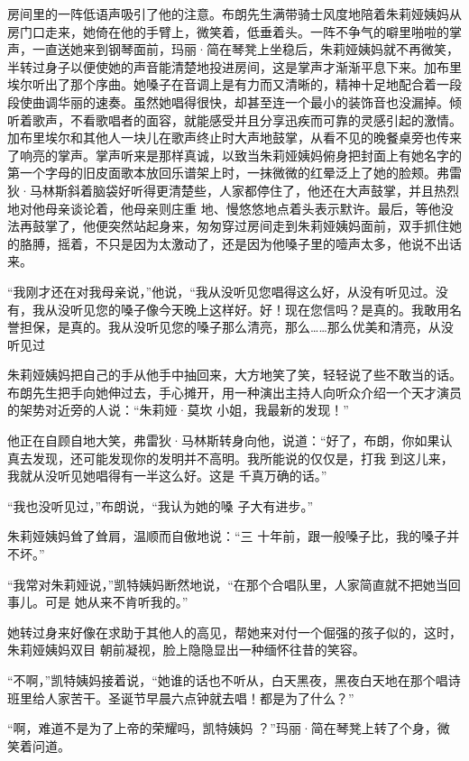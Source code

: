 \documentclass{article}
\begin{document}
房间里的一阵低语声吸引了他的注意。布朗先生满带骑士风度地陪着朱莉娅姨妈从房门口走来，她倚在他的手臂上，微笑着，低垂着头。一阵不争气的噼里啪啦的掌声，一直送她来到钢琴面前，玛丽·简在琴凳上坐稳后，朱莉娅姨妈就不再微笑，半转过身子以便使她的声音能清楚地投进房间，这是掌声才渐渐平息下来。加布里埃尔听出了那个序曲。她嗓子在音调上是有力而又清晰的，精神十足地配合着一段段使曲调华丽的速奏。虽然她唱得很快，却甚至连一个最小的装饰音也没漏掉。倾听着歌声，不看歌唱者的面容，就能感受并且分享迅疾而可靠的灵感引起的激情。加布里埃尔和其他人一块儿在歌声终止时大声地鼓掌，从看不见的晚餐桌旁也传来了响亮的掌声。掌声听来是那样真诚，以致当朱莉娅姨妈俯身把封面上有她名字的第一个字母的旧皮面歌本放回乐谱架上时，一抹微微的红晕泛上了她的脸颊。弗雷狄·马林斯斜着脑袋好听得更清楚些，人家都停住了，他还在大声鼓掌，并且热烈地对他母亲谈论着，他母亲则庄重
\newpage
地、慢悠悠地点着头表示默许。最后，等他没法再鼓掌了，他便突然站起身来，匆匆穿过房间走到朱莉娅姨妈面前，双手抓住她的胳膊，摇着，不只是因为太激动了，还是因为他嗓子里的噎声太多，他说不出话
来。 

“我刚才还在对我母亲说，”他说，“我从没听见您唱得这么好，从没有听见过。没有，我从没听见您的嗓子像今天晚上这样好。好！现在您信吗？是真的。我敢用名誉担保，是真的。我从没听见您的嗓子那么清亮，那么……那么优美和清亮，从没听见过

朱莉娅姨妈把自己的手从他手中抽回来，大方地笑了笑，轻轻说了些不敢当的话。布朗先生把手向她伸过去，手心摊开，用一种演出主持人向听众介绍一个天才演员的架势对近旁的人说：“朱莉娅·莫坎
小姐，我最新的发现！” 

他正在自顾自地大笑，弗雷狄·马林斯转身向他，说道：“好了，布朗，你如果认真去发现，还可能发现你的发明并不高明。我所能说的仅仅是，打我
\newpage
到这儿来，我就从没听见她唱得有一半这么好。这是
千真万确的话。” 

“我也没听见过，”布朗说，“我认为她的嗓
子大有进步。” 

朱莉娅姨妈耸了耸肩，温顺而自傲地说：“三
十年前，跟一般嗓子比，我的嗓子并不坏。” 

“我常对朱莉娅说，”凯特姨妈断然地说，“在那个合唱队里，人家简直就不把她当回事儿。可是
她从来不肯听我的。” 

她转过身来好像在求助于其他人的高见，帮她来对付一个倔强的孩子似的，这时，朱莉娅姨妈双目
朝前凝视，脸上隐隐显出一种缅怀往昔的笑容。 

“不啊，”凯特姨妈接着说，“她谁的话也不听从，白天黑夜，黑夜白天地在那个唱诗班里给人家苦干。圣诞节早晨六点钟就去唱！都是为了什么？”

\newpage

“啊，难道不是为了上帝的荣耀吗，凯特姨妈
？”玛丽·简在琴凳上转了个身，微笑着问道。 
\end{document}
